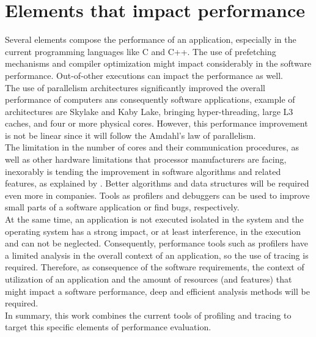 \section{Elements that impact performance}  %
Several elements compose the performance of an application, especially in the current programming languages like C and C++. The use of prefetching mechanisms and compiler optimization might impact considerably in the software performance. Out-of-other executions can impact the performance as well.\\
The use of parallelism architectures significantly improved the overall performance of computers ans consequently software applications, example of architectures are Skylake and Kaby Lake, bringing hyper-threading, large L3 caches, and four or more physical cores. However, this performance improvement is not be linear since it will follow the Amdahl's law of parallelism. \\
The limitation in the number of cores and their communication procedures, as well as other hardware limitations that processor manufacturers are facing, inexorably is tending the improvement in software algorithms and related features, as explained by \cite{limitations}. Better algorithms and data structures will be required even more in companies. Tools as profilers and debuggers can be used to improve small parts of a software application or find bugs, respectively.\\
At the same time, an application is not executed isolated in the system and the operating system has a strong impact, or at least interference, in the execution and can not be neglected. Consequently, performance tools such as profilers have a limited analysis in the overall context of an application, so the use of tracing is required.
Therefore, as consequence of the software requirements, the context of utilization of an application and the amount of resources (and features) that might impact a software performance, deep and efficient analysis methods will be required. \\
In summary, this work combines the current tools of profiling and tracing to target this specific elements of performance evaluation.

